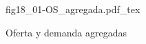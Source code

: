 \begin{figure}[h]
\centering
\def\svgwidth{0.5\textwidth}
{fig18_01-OS_agregada.pdf_tex}
\caption{Oferta y demanda agregadas}
\label{fig18_01-OS_agregada}
\end{figure}